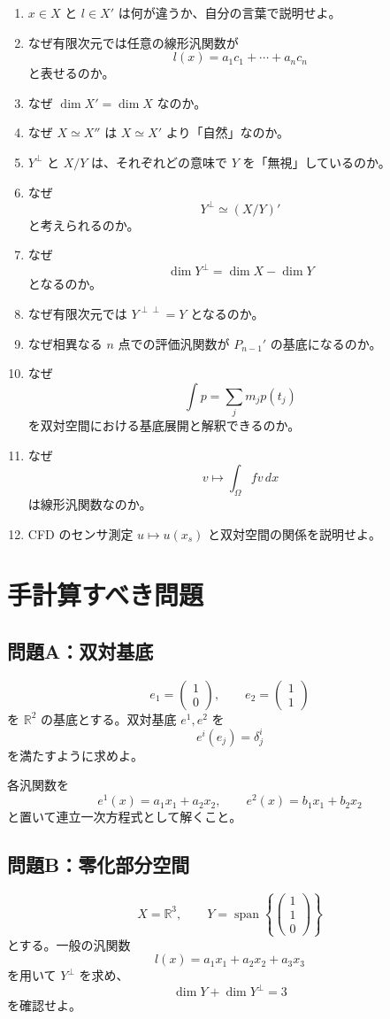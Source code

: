 \documentclass[a4paper,11pt]{ltjsarticle}
\newcommand{\R}{\mathbb{R}}
\newcommand{\Span}{\operatorname{span}}
\begin{document}
\begin{enumerate}
  \item $x\in X$ と $l\in X'$ は何が違うか、自分の言葉で説明せよ。
  \item なぜ有限次元では任意の線形汎関数が
  \[
  l(x)=a_1c_1+\cdots+a_nc_n
  \]
  と表せるのか。
  \item なぜ $\dim X'=\dim X$ なのか。
  \item なぜ $X\simeq X''$ は $X\simeq X'$ より「自然」なのか。
  \item $Y^\perp$ と $X/Y$ は、それぞれどの意味で $Y$ を「無視」しているのか。
  \item なぜ
  \[
  Y^\perp\simeq(X/Y)'
  \]
  と考えられるのか。
  \item なぜ
  \[
  \dim Y^\perp=\dim X-\dim Y
  \]
  となるのか。
  \item なぜ有限次元では $Y^{\perp\perp}=Y$ となるのか。
  \item なぜ相異なる $n$ 点での評価汎関数が $P_{n-1}'$ の基底になるのか。
  \item なぜ
  \[
  \int p=\sum_jm_jp(t_j)
  \]
  を双対空間における基底展開と解釈できるのか。
  \item なぜ
  \[
  v\mapsto\int_\Omega fv\,dx
  \]
  は線形汎関数なのか。
  \item CFD のセンサ測定 $u\mapsto u(x_s)$ と双対空間の関係を説明せよ。
\end{enumerate}

\section{手計算すべき問題}

\subsection{問題A：双対基底}
\[
e_1=\begin{pmatrix}1\\0\end{pmatrix},\qquad
 e_2=\begin{pmatrix}1\\1\end{pmatrix}
\]
を $\R^2$ の基底とする。双対基底 $e^1,e^2$ を
\[
e^i(e_j)=\delta^i_j
\]
を満たすように求めよ。

各汎関数を
\[
e^1(x)=a_1x_1+a_2x_2,
\qquad
e^2(x)=b_1x_1+b_2x_2
\]
と置いて連立一次方程式として解くこと。

\subsection{問題B：零化部分空間}
\[
X=\R^3,
\qquad
Y=\Span\left\{\begin{pmatrix}1\\1\\0\end{pmatrix}\right\}
\]
とする。一般の汎関数
\[
l(x)=a_1x_1+a_2x_2+a_3x_3
\]
を用いて $Y^\perp$ を求め、
\[
\dim Y+\dim Y^\perp=3
\]
を確認せよ。
\end{document}
